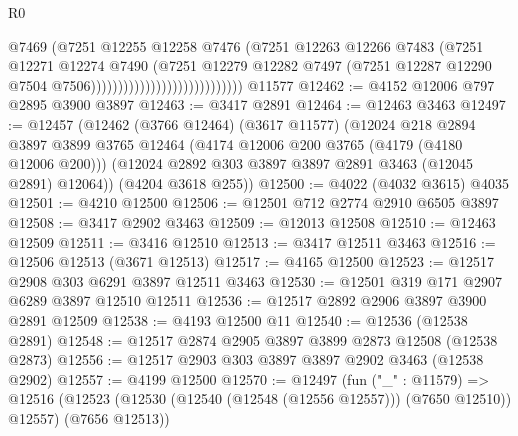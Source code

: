 \begin{lexlean}{R0}
\begin{coremodule}
                                                  @7469
                                                  (@7251
                                                    @12255
                                                    @12258
                                                    @7476
                                                    (@7251
                                                      @12263
                                                      @12266
                                                      @7483
                                                      (@7251
                                                        @12271
                                                        @12274
                                                        @7490
                                                        (@7251
                                                          @12279
                                                          @12282
                                                          @7497
                                                          (@7251
                                                            @12287
                                                            @12290
                                                            @7504
                                                            @7506))))))))))))))))))))))))))))
    @11577
@12462 := @4152 @12006 @797 @2895 @3900 @3897
@12463 := @3417 @2891
@12464 := @12463 @3463
@12497 := @12457
    (@12462
      (@3766 @12464)
      (@3617 @11577)
      (@12024
        @218
        @2894
        @3897
        @3899
        @3765
        @12464
        (@4174 @12006 @200 @3765 (@4179 (@4180 @12006 @200)))
        (@12024 @2892 @303 @3897 @3897 @2891 @3463 (@12045 @2891) @12064))
      (@4204 @3618 @255))
@12500 := @4022 (@4032 @3615) @4035
@12501 := @4210 @12500
@12506 := @12501 @712 @2774 @2910 @6505 @3897
@12508 := @3417 @2902 @3463
@12509 := @12013 @12508
@12510 := @12463 @12509
@12511 := @3416 @12510
@12513 := @3417 @12511 @3463
@12516 := @12506 @12513 (@3671 @12513)
@12517 := @4165 @12500
@12523 := @12517 @2908 @303 @6291 @3897 @12511 @3463
@12530 := @12501 @319 @171 @2907 @6289 @3897 @12510 @12511
@12536 := @12517 @2892 @2906 @3897 @3900 @2891 @12509
@12538 := @4193 @12500 @11
@12540 := @12536 (@12538 @2891)
@12548 := @12517 @2874 @2905 @3897 @3899 @2873 @12508 (@12538 @2873)
@12556 := @12517 @2903 @303 @3897 @3897 @2902 @3463 (@12538 @2902)
@12557 := @4199 @12500
@12570 := @12497
    (fun ("_" : @11579) =>
    @12516 (@12523 (@12530 (@12540 (@12548 (@12556 @12557))) (@7650 @12510)) @12557) (@7656 @12513))

\end{coremodule}
\end{lexlean}
